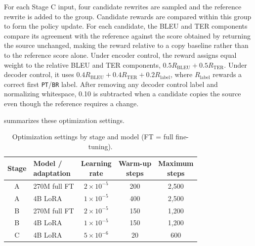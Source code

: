 \documentclass[acmtog,nonacm]{acmart}
\begin{document}
For each Stage C input, four candidate rewrites are sampled and the reference
rewrite is added to the group. Candidate rewards are compared within this
group to form the policy update. For each candidate, the BLEU \citep{papineni2002bleu} and TER
\citep{snover2006study} components compare its agreement with the reference
against the score obtained by returning the source unchanged, making the reward
relative to a copy baseline rather than to the reference score alone. Under
encoder control, the reward assigns equal weight to the relative BLEU and TER
components, \(0.5R_{\mathrm{BLEU}}+0.5R_{\mathrm{TER}}\). Under decoder
control, it uses
\(0.4R_{\mathrm{BLEU}}+0.4R_{\mathrm{TER}}+0.2R_{\mathrm{label}}\), where
\(R_{\mathrm{label}}\) rewards a correct first \texttt{PT}/\texttt{BR} label.
After removing any decoder control label and normalizing whitespace, 0.10 is
subtracted when a candidate copies the source even though the reference
requires a change.

 summarizes these optimization settings.

\begin{table}[t]
  \centering
  \small
  \renewcommand{\arraystretch}{1.12}
  \setlength{\tabcolsep}{2.2pt}

  \caption{Optimization settings by stage and model (FT = full fine-tuning).}
  \label{tab:training-settings}

  \begin{tabular}{@{}clccc@{}}
    \toprule
    \textbf{Stage}
    & \shortstack[l]{\textbf{Model /}\\\textbf{adaptation}}
    & \shortstack{\textbf{Learning}\\\textbf{rate}}
    & \shortstack{\textbf{Warm-up}\\\textbf{steps}}
    & \shortstack{\textbf{Maximum}\\\textbf{steps}} \\
    \midrule
    A & 270M full FT & \(2 \times 10^{-5}\) & 200 & 2,500 \\
    A & 4B LoRA     & \(1 \times 10^{-5}\) & 400 & 2,500 \\
    B & 270M full FT & \(2 \times 10^{-5}\) & 150 & 1,200 \\
    B & 4B LoRA     & \(1 \times 10^{-5}\) & 150 & 1,200 \\
    C & 4B LoRA     & \(5 \times 10^{-6}\) & 20  & 600 \\
    \bottomrule
  \end{tabular}
\end{table}
\end{document}
